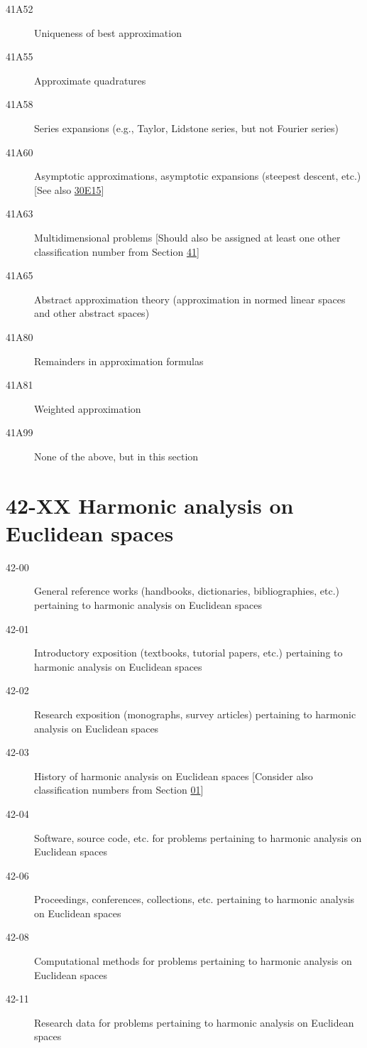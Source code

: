 \begin{description}
\item [41A52]\label{41A52} Uniqueness of best approximation
\item [41A55]\label{41A55} Approximate quadratures
\item [41A58]\label{41A58} Series expansions (e.g., Taylor, Lidstone series, but not Fourier series)
\item [41A60]\label{41A60} Asymptotic approximations, asymptotic expansions (steepest descent, etc.) [See also \hyperref[30E15]{30E15}]
\item [41A63]\label{41A63} Multidimensional problems [Should also be assigned at least one other classification number from Section \hyperref[41-XX]{41}]
\item [41A65]\label{41A65} Abstract approximation theory (approximation in normed linear spaces and other abstract spaces)
\item [41A80]\label{41A80} Remainders in approximation formulas
\item [41A81]\label{41A81} Weighted approximation
\item [41A99]\label{41A99} None of the above, but in this section
\end{description}
\section*{42-XX Harmonic analysis on Euclidean spaces }\label{42-XX}
\begin{description}
\item [42-00]\label{42-00} General reference works (handbooks, dictionaries, bibliographies, etc.) pertaining to harmonic analysis on Euclidean spaces
\item [42-01]\label{42-01} Introductory exposition (textbooks, tutorial papers, etc.) pertaining to harmonic analysis on Euclidean spaces
\item [42-02]\label{42-02} Research exposition (monographs, survey articles) pertaining to harmonic analysis on Euclidean spaces
\item [42-03]\label{42-03} History of harmonic analysis on Euclidean spaces [Consider also classification numbers from Section \hyperref[01-XX]{01}]
\item [42-04]\label{42-04} Software, source code, etc. for problems pertaining to harmonic analysis on Euclidean spaces
\item [42-06]\label{42-06} Proceedings, conferences, collections, etc. pertaining to harmonic analysis on Euclidean spaces
\item [42-08]\label{42-08} Computational methods for problems pertaining to harmonic analysis on Euclidean spaces
\item [42-11]\label{42-11} Research data for problems pertaining to harmonic analysis on Euclidean spaces
\end{description}
